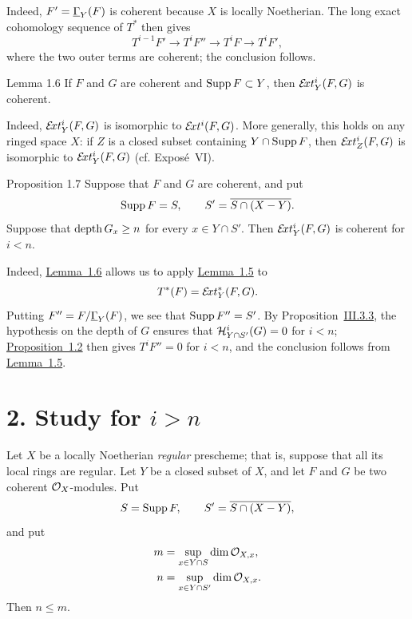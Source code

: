 Indeed, $F'=\underline{\Gamma}_Y(F)$ is coherent because $X$ is locally Noetherian. The
long exact cohomology sequence of $T^{\ast}$ then gives
\[
  T^{i-1}F'\longrightarrow T^iF''\longrightarrow T^iF
  \longrightarrow T^iF',
\]
where the two outer terms are coherent; the conclusion follows.

\begin{sgastatement}{Lemma 1.6}
If $F$ and $G$ are coherent and $\operatorname{Supp} F\subset Y$, then
$\mathcal E\!xt_Y^i(F,G)$ is coherent.
\end{sgastatement}

Indeed, $\mathcal E\!xt_Y^i(F,G)$ is isomorphic to $\mathcal E\!xt^i(F,G)$. More
generally, this holds on any ringed space $X$: if $Z$ is a closed subset
containing $Y\cap\operatorname{Supp} F$, then $\mathcal E\!xt_Z^i(F,G)$ is isomorphic to
$\mathcal E\!xt_Y^i(F,G)$ (cf. Expos\'e~VI).

\begin{sgastatement}{Proposition 1.7}
Suppose that $F$ and $G$ are coherent, and put
\[
  \operatorname{Supp} F=S,\qquad S'=\overline{S\cap(X-Y)}.
\]
Suppose that $\operatorname{depth} G_x\geq n$ for every $x\in Y\cap S'$. Then
$\mathcal E\!xt_Y^i(F,G)$ is coherent for $i<n$.
\end{sgastatement}

Indeed, \hyperref[VII.1.6]{Lemma~1.6} allows us to apply \hyperref[VII.1.5]{Lemma~1.5} to
\[
  T^{\ast}(F)=\mathcal E\!xt_Y^{\ast}(F,G).
\]
Putting $F''=F/\underline{\Gamma}_Y(F)$, we see that $\operatorname{Supp} F''=S'$. By
Proposition~\hyperref[III.3.3]{III.3.3}, the hypothesis on the depth of $G$ ensures that
$\mathcal H^i_{Y\cap S'}(G)=0$ for $i<n$; \hyperref[VII.1.2]{Proposition~1.2} then gives
$T^iF''=0$ for $i<n$, and the conclusion follows from \hyperref[VII.1.5]{Lemma~1.5}.

\section*{2. Study for $i>n$}

Let $X$ be a locally Noetherian \emph{regular} prescheme; that is, suppose that
all its local rings are regular. Let $Y$ be a closed subset of $X$, and let
$F$ and $G$ be two coherent $\mathcal O_X$-modules. Put
\[
  S=\operatorname{Supp} F,\qquad S'=\overline{S\cap(X-Y)},
\]
and put
\begin{align*}
  m&=\sup_{x\in Y\cap S}\dim\mathcal O_{X,x},\\
  n&=\sup_{x\in Y\cap S'}\dim\mathcal O_{X,x}.
\end{align*}
Then $n\leq m$.

